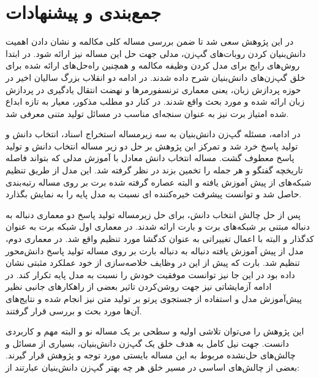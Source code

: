 \chapter{جمع‌بندی و پیشنهادات}\label{Chap6}

در این پژوهش سعی شد تا ضمن بررسی مساله کلی مکالمه و نشان دادن اهمیت دانش‌بنیان کردن روبات‌های گپ‌زن،‌ مدلی جهت حل این مساله نیز ارائه شود. 
در ابتدا روش‌های رایج برای مدل کردن وظیفه مکالمه و همچنین راه‌حل‌های ارائه شده برای خلق گپ‌زن‌های دانش‌بنیان شرح داده شدند. در ادامه دو انقلاب بزرگ سالیان اخیر در حوزه پردازش زبان، یعنی معماری ترنسفورمر‌ها و نهضت انتقال یادگیری در پردازش زبان ارائه شده و مورد بحث واقع شدند. در کنار دو مطلب مذکور، معیار به تازه ابداع شده امتیاز برت نیز به عنوان سنجه‌ای مناسب در مسائل تولید متنی معرفی شد. 

در ادامه، مسئله گپ‌زن دانش‌بنیان به سه زیرمساله استخراج اسناد،‌ انتخاب دانش و تولید پاسخ خرد شد و تمرکز این پژوهش بر حل دو زیر مساله انتخاب دانش و تولید پاسخ معطوف گشت. مساله انتخاب دانش معادل با آموزش مدلی که بتواند فاصله تاریخچه گفتگو و هر جمله را تخمین بزند در نظر گرفته شد. این مدل از طریق تنظیم شبکه‌های از پیش آموزش یافته و البته عصاره گرفته شده برت بر روی مساله رتبه‌بندی حاصل شد و توانست پیشرفت خیره‌کننده ای نسبت به مدل پایه را به نمایش بگذارد. 

پس از حل چالش انتخاب دانش، برای حل زیرمساله تولید پاسخ دو معماری دنباله به دنباله
مبتنی بر شبکه‌های برت و بارت ارائه شدند. در معماری اول شبکه برت به عنوان کدگذار و البته با اعمال تغییراتی به عنوان کدگشا مورد تنظیم واقع شد. در معماری دوم، مدل از پیش آموزش یافته دنباله به دنباله بارت بر روی مساله تولید پاسخ دانش‌محور تنظیم شد. بارت که پیش از این در وظایف خلاصه‌سازی از خود عملکرد مثبتی نشان داده بود در این جا نیز توانست موفقیت خودش را نسبت به مدل پایه تکرار کند. در ادامه آزمایشاتی نیز جهت روشن‌کردن تاثیر بعضی از راهکار‌های جانبی نظیر پیش‌آموزش مدل و استفاده از جستجوی پرتو بر تولید متن نیز انجام شده و نتایج‌های آن‌ها مورد بحث و بررسی قرار گرفتند. 

این پژوهش را می‌توان تلاشی اولیه و سطحی بر یک مساله نو و البته مهم و کاربردی دانست. جهت نیل کامل به هدف خلق یک گپ‌زن دانش‌بنیان، بسیاری از مسائل و چالش‌‌های حل‌نشده مربوط به این مساله بایستی مورد توجه و پژوهش قرار گیرند. بعضی از چالش‌های اساسی در مسیر خلق هر چه بهتر گپ‌زن دانش‌بنیان عبارتند از:

